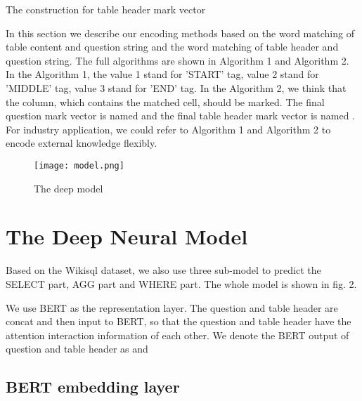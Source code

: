 \documentclass{llncs}
\begin{document}
\begin{algorithm}
\caption{The construction for table header mark vector}
\label{alg:A}
\begin{algorithmic}
\ENDIF
{}
\ENDFOR

\ENDIF
\ENDFOR

\end{algorithmic}
\end{algorithm}


In this section we describe our encoding methods based on the word matching of table content and question string and the word matching of table header and question string. The full algorithms are shown in Algorithm 1 and Algorithm 2. In the Algorithm 1, the value 1 stand for 'START' tag, value 2 stand for 'MIDDLE' tag, value 3 stand for 'END' tag. In the Algorithm 2, we think that the column, which contains the matched cell, should be marked. The final question mark vector is named  and the final table header mark vector is named . For industry application, we could refer to Algorithm 1 and Algorithm 2 to encode external knowledge flexibly.



\begin{figure}
\centering
\texttt{[image: model.png]}
\caption{The deep model} \label{fig1}
\end{figure}


\section{The Deep Neural Model}

Based on the Wikisql dataset, we also use three sub-model to predict the SELECT part, AGG part and WHERE part. The whole model is shown in fig. 2.


We use BERT as the representation layer. The question and table header are concat and then input to BERT, so that the question and table header have the attention interaction information of each other.
We denote the BERT output of question and table header as  and 

\subsection{BERT embedding layer}
\end{document}
